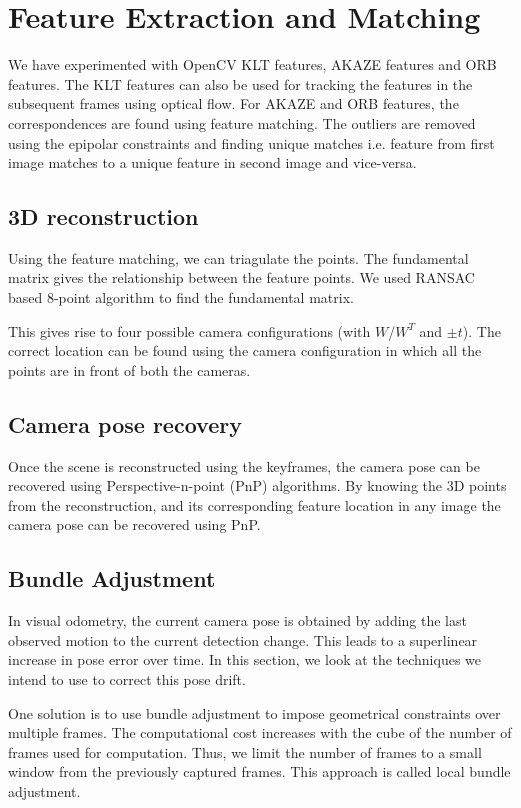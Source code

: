 \documentclass{article}
\begin{document}
\section{Feature Extraction and Matching}
We have experimented with OpenCV KLT features, AKAZE features and ORB features. The KLT features can also be used for tracking the features in the subsequent frames using optical flow. For AKAZE\cite{akaze} and ORB features, the correspondences are found using feature matching. The outliers are removed using the epipolar constraints and finding unique matches i.e. feature from first image matches to a unique feature in second image and vice-versa.

\subsection{3D reconstruction}
Using the feature matching, we can triagulate the points. The fundamental matrix gives the relationship between the feature points. We used RANSAC based 8-point algorithm to find the fundamental matrix.

This gives rise to four possible camera configurations (with $W$/$W^T$ and $\pm t$). The correct location can be found using the camera configuration in which all the points are in front of both the cameras.

\subsection{Camera pose recovery}
Once the scene is reconstructed using the keyframes, the camera pose can be recovered using Perspective-n-point (PnP) algorithms. By knowing the 3D points from the reconstruction, and its corresponding feature location in any image the camera pose can be recovered using PnP.

\subsection{Bundle Adjustment}
In visual odometry, the current camera pose is obtained by adding the last observed motion to the current detection change. This leads to a superlinear increase in pose error over time. In this section, we look at the techniques we intend to use to correct this pose drift.

One solution is to use bundle adjustment to impose geometrical constraints over multiple
frames. The computational cost increases with the cube of the number of frames used for computation. Thus, we limit the number of frames to a small window from the previously captured frames. This approach is called local bundle adjustment.
\end{document}
